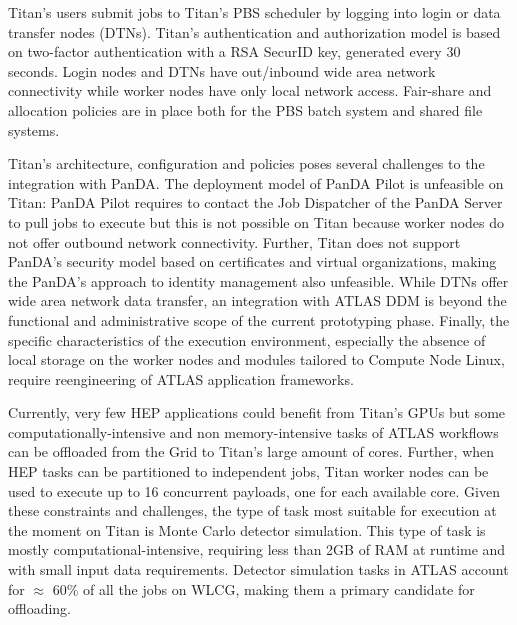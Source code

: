 Titan's users submit jobs to Titan's PBS scheduler by logging into login or data
transfer nodes (DTNs). Titan's authentication and authorization model is based
on two-factor authentication with a RSA SecurID key, generated every 30 seconds.
Login nodes and DTNs have out/inbound wide area network connectivity while
worker nodes have only local network access. Fair-share and allocation policies
are in place both for the PBS batch system and shared file systems.


Titan's architecture, configuration and policies poses several challenges to the
integration with PanDA. The deployment model of PanDA Pilot is unfeasible on
Titan: PanDA Pilot requires to contact the Job Dispatcher of the PanDA Server to
pull jobs to execute but this is not possible on Titan because worker nodes do
not offer outbound network connectivity. Further, Titan does not support PanDA's
security model based on certificates and virtual organizations, making the
PanDA's approach to identity management also unfeasible. While DTNs offer wide
area network data transfer, an integration with ATLAS DDM is beyond the
functional and administrative scope of the current prototyping phase. Finally,
the specific characteristics of the execution environment, especially the
absence of local storage on the worker nodes and modules tailored to Compute
Node Linux, require reengineering of ATLAS application frameworks.

Currently, very few HEP applications could benefit from Titan's GPUs but some
computationally-intensive and non memory-intensive tasks of ATLAS workflows can
be offloaded from the Grid to Titan's large amount of cores. Further, when HEP
tasks can be partitioned to independent jobs, Titan worker nodes can be used to
execute up to 16 concurrent payloads, one for each available core. Given these
constraints and challenges, the type of task most suitable for execution at the
moment on Titan is Monte Carlo detector simulation. This type of task is mostly
computational-intensive, requiring less than 2GB of RAM at runtime and with
small input data requirements. Detector simulation tasks in ATLAS account for
$\approx$ 60\% of all the jobs on WLCG, making them a primary candidate for
offloading.

